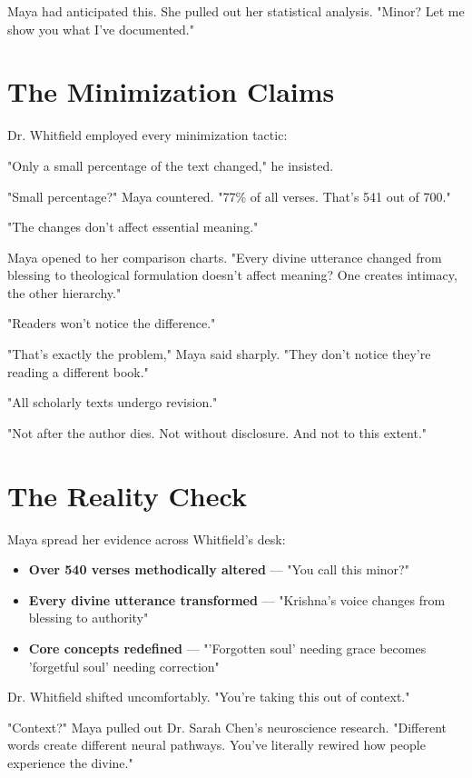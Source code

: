 \documentclass[11pt,twoside]{book}
\begin{document}
Maya had anticipated this. She pulled out her statistical analysis. "Minor? Let me show you what I've documented."
\section*{The Minimization Claims}
\label{sec:org595aa09}

Dr. Whitfield employed every minimization tactic:

"Only a small percentage of the text changed," he insisted.

"Small percentage?" Maya countered. "77\% of all verses. That's 541 out of 700."

"The changes don't affect essential meaning."

Maya opened to her comparison charts. "Every divine utterance changed from blessing to theological formulation doesn't affect meaning? One creates intimacy, the other hierarchy."

"Readers won't notice the difference."

"That's exactly the problem," Maya said sharply. "They don't notice they're reading a different book."

"All scholarly texts undergo revision."

"Not after the author dies. Not without disclosure. And not to this extent."
\section*{The Reality Check}
\label{sec:org030d429}

Maya spread her evidence across Whitfield's desk:

\begin{itemize}
\item \textbf{\textbf{Over 540 verses methodically altered}} — "You call this minor?"
\item \textbf{\textbf{Every divine utterance transformed}} — "Krishna's voice changes from blessing to authority"
\item \textbf{\textbf{Core concepts redefined}} — "'Forgotten soul' needing grace becomes 'forgetful soul' needing correction"
\end{itemize}

Dr. Whitfield shifted uncomfortably. "You're taking this out of context."

"Context?" Maya pulled out Dr. Sarah Chen's neuroscience research. "Different words create different neural pathways. You've literally rewired how people experience the divine."
\end{document}
